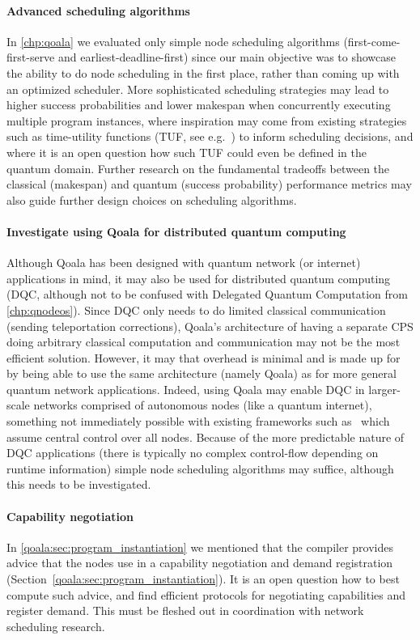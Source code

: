 \paragraph{Advanced scheduling algorithms}
In \cref{chp:qoala} we evaluated only simple node scheduling algorithms (first-come-first-serve and earliest-deadline-first) since our main objective was to showcase the ability to do node scheduling in the first place, rather than coming up with an optimized scheduler.
More sophisticated scheduling strategies may lead to higher success probabilities and lower makespan when concurrently executing multiple program instances, where inspiration may come from existing strategies such as time-utility functions (TUF, see e.g.~\cite{jensen1993timeliness, li2004utility}) to inform scheduling decisions, and where it is an open question how such TUF could even be defined in the quantum domain.
Further research on the fundamental tradeoffs between the classical (makespan) and quantum (success probability) performance metrics may also guide further design choices on scheduling algorithms.

\paragraph{Investigate using Qoala for distributed quantum computing}
Although Qoala has been designed with quantum network (or internet) applications in mind, it may also be used for distributed quantum computing (DQC, although not to be confused with Delegated Quantum Computation from \cref{chp:qnodeos}).
Since DQC only needs to do limited classical communication (sending teleportation corrections), Qoala's architecture of having a separate CPS doing arbitrary classical computation and communication may not be the most efficient solution.
However, it may that overhead is minimal and is made up for by being able to use the same architecture (namely Qoala) as for more general quantum network applications.
Indeed, using Qoala may enable DQC in larger-scale networks comprised of autonomous nodes (like a quantum internet), something not immediately possible with existing frameworks such as~\cite{diadamo_distributed_2021} which assume central control over all nodes.
Because of the more predictable nature of DQC applications (there is typically no complex control-flow depending on runtime information) simple node scheduling algorithms may suffice, although this needs to be investigated.


\paragraph{Capability negotiation}
In \cref{qoala:sec:program_instantiation} we mentioned that the compiler provides advice that the nodes use in a capability negotiation and demand registration (Section~\ref{qoala:sec:program_instantiation}).
It is an open question how to best compute such advice, and find efficient protocols for negotiating capabilities and register demand.
This must be fleshed out in coordination with network scheduling research.


